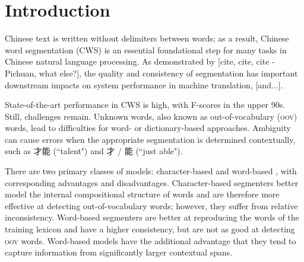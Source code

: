 \section{Introduction}

Chinese text is written without delimiters between words; as a result, Chinese word segmentation (CWS) is an essential foundational step for many tasks in Chinese natural language processing. As demonstrated by [cite, cite, cite - Pichuan, what else?], the quality and consistency of segmentation has important downstream impacts on system performance in machine translation, [and...].

State-of-the-art performance in CWS is high, with F-scores in the upper 90s. %
Still, challenges remain. Unknown words, also known as out-of-vocabulary (\textsc{oov}) words, lead to difficulties for word- or dictionary-based approaches.
Ambiguity can cause errors when the appropriate segmentation is determined contextually, such as 才能 (``talent") and 才 / 能 (``just able"). %

There are two primary classes of models: character-based \cite{Xue:2003:IJCLCLP,Tseng:2005:SIGHAN,Zhang:2006:HLT-NAACL,Wang:2010:COLING} and word-based \cite{Andrew:2006:EMNLP,Zhang:2007:ACL}, with corresponding advantages and disadvantages. Character-based segmenters better model the internal compositional structure of words and are therefore more effective at detecting out-of-vocabulary words; however, they suffer from relative inconsistency. %
Word-based segmenters are better at reproducing the words of the training lexicon and have a higher consistency, but are not as good at detecting \textsc{oov} words. Word-based models have the additional advantage that they tend to capture information from significantly larger contextual spans.


